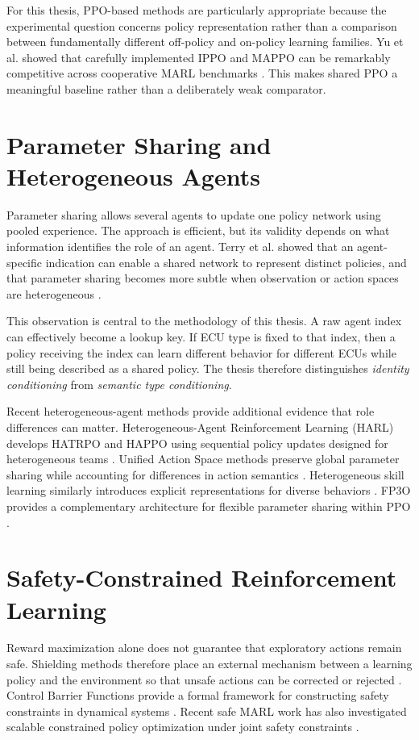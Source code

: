 \documentclass{iutbscthesis}
\begin{document}
For this thesis, PPO-based methods are particularly appropriate because the experimental question concerns policy representation rather than a comparison between fundamentally different off-policy and on-policy learning families. Yu et al. showed that carefully implemented IPPO and MAPPO can be remarkably competitive across cooperative MARL benchmarks \parencite{yu2022surprising}. This makes shared PPO a meaningful baseline rather than a deliberately weak comparator.

\section{Parameter Sharing and Heterogeneous Agents}
Parameter sharing allows several agents to update one policy network using pooled experience. The approach is efficient, but its validity depends on what information identifies the role of an agent. Terry et al. showed that an agent-specific indication can enable a shared network to represent distinct policies, and that parameter sharing becomes more subtle when observation or action spaces are heterogeneous \parencite{terry2020revisiting}.

This observation is central to the methodology of this thesis. A raw agent index can effectively become a lookup key. If ECU type is fixed to that index, then a policy receiving the index can learn different behavior for different ECUs while still being described as a shared policy. The thesis therefore distinguishes \emph{identity conditioning} from \emph{semantic type conditioning}.

Recent heterogeneous-agent methods provide additional evidence that role differences can matter. Heterogeneous-Agent Reinforcement Learning (HARL) develops HATRPO and HAPPO using sequential policy updates designed for heterogeneous teams \parencite{zhong2023harl}. Unified Action Space methods preserve global parameter sharing while accounting for differences in action semantics \parencite{yu2024uas}. Heterogeneous skill learning similarly introduces explicit representations for diverse behaviors \parencite{liu2022hskill}. FP3O provides a complementary architecture for flexible parameter sharing within PPO \parencite{feng2023fp3o}.

\section{Safety-Constrained Reinforcement Learning}
Reward maximization alone does not guarantee that exploratory actions remain safe. Shielding methods therefore place an external mechanism between a learning policy and the environment so that unsafe actions can be corrected or rejected \parencite{alshiekh2018shielding}. Control Barrier Functions provide a formal framework for constructing safety constraints in dynamical systems \parencite{ames2019cbf}. Recent safe MARL work has also investigated scalable constrained policy optimization under joint safety constraints \parencite{zhang2024scalmap}.
\end{document}
